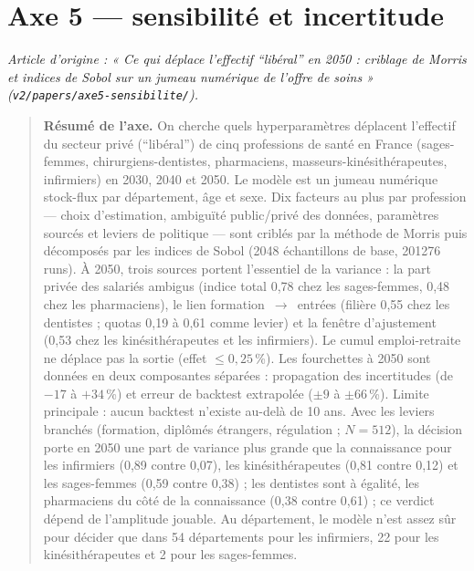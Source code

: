 \part{Axe 5 --- sensibilité et incertitude}
\noindent\textit{Article d'origine : « Ce qui déplace l'effectif \enquote{libéral} en 2050 : criblage de Morris et indices de Sobol sur un jumeau numérique de l'offre de soins » (\texttt{v2/papers/axe5-sensibilite/}).}

\begin{quote}\small\textbf{Résumé de l'axe.} On cherche quels hyperparamètres déplacent l'effectif du secteur privé (\enquote{libéral}) de cinq professions de santé
en France (sages-femmes, chirurgiens-dentistes, pharmaciens, masseurs-kinésithérapeutes, infirmiers) en 2030, 2040
et 2050. Le modèle est un jumeau numérique stock-flux par département, âge et sexe. Dix facteurs au plus par
profession --- choix d'estimation, ambiguïté public/privé des données, paramètres sourcés et leviers de politique
--- sont criblés par la méthode de Morris puis décomposés par les indices de Sobol (\num{2048} échantillons de
base, \num{201276}\mesure{} runs). À 2050, trois sources portent l'essentiel de la variance : la part privée des
salariés ambigus (indice total 0,78\mesure{} chez les sages-femmes, 0,48\mesure{} chez les pharmaciens), le lien
formation~$\to$~entrées (filière 0,55\mesure{} chez les dentistes ; quotas 0,19 à 0,61\mesure{} comme levier) et la
fenêtre d'ajustement (0,53\mesure{} chez les kinésithérapeutes et les infirmiers). Le cumul emploi-retraite ne
déplace pas la sortie (effet $\le 0{,}25$\,\%\mesure{}). Les fourchettes à 2050 sont données en deux composantes
séparées : propagation des incertitudes (de $-17$ à $+34$\,\%\mesure{}) et erreur de backtest extrapolée
($\pm 9$ à $\pm 66$\,\%\derive{}). Limite principale : aucun backtest n'existe au-delà de 10 ans. Avec les leviers branchés (formation, diplômés étrangers, régulation ; $N = 512$), la
décision porte en 2050 une part de variance plus grande que la connaissance pour les infirmiers (0,89 contre
0,07\mesure{}), les kinésithérapeutes (0,81 contre 0,12\mesure{}) et les sages-femmes (0,59 contre 0,38\mesure{}) ;
les dentistes sont à égalité, les pharmaciens du côté de la connaissance (0,38 contre 0,61\mesure{}) ; ce verdict
dépend de l'amplitude jouable. Au département, le modèle n'est assez sûr pour décider que dans 54\mesure{}
départements pour les infirmiers, 22\mesure{} pour les kinésithérapeutes et 2\mesure{} pour les sages-femmes.\end{quote}


